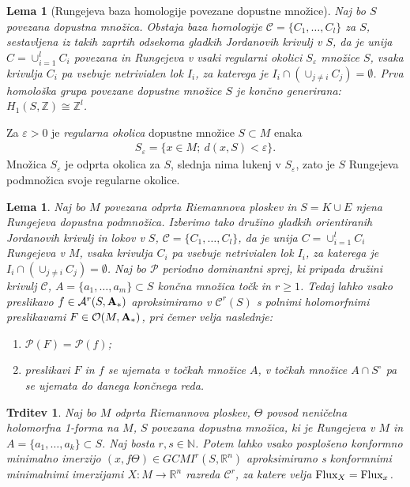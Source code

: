 \documentclass[12pt,a4paper,twoside]{article}
\theoremstyle{definition} %
\theoremstyle{plain} %
\newtheorem{lema}[definicija]{Lema}
\newtheorem{trditev}[definicija]{Trditev}
\numberwithin{equation}{section}  %
\newcommand{\R}{\mathbb R}
\newcommand{\N}{\mathbb N}
\begin{document}
\begin{lema} [Rungejeva baza homologije povezane dopustne množice]
Naj bo $S$ povezana dopustna množica. Obstaja baza homologije $\mathcal{C} = \{ C_{1}, \dots , C_{l} \}$ za $S$, sestavljena iz takih zaprtih odsekoma gladkih Jordanovih krivulj v $S$, da je unija $C = \cup_{i=1}^{l} C_{i}$ povezana in Rungejeva v vsaki regularni okolici $S_{\varepsilon}$ množice $S$, vsaka krivulja $C_{i}$ pa vsebuje netrivialen lok $I_{i}$, za katerega je $I_{i} \cap (\cup_{j \neq i} C_{j}) = \emptyset$.
Prva homološka grupa povezane dopustne množice $S$ je končno generirana: $H_{1}(S, \mathbb{Z}) \cong \mathbb{Z}^{l}$.
\end{lema}

Za $\varepsilon > 0$ je \emph{regularna okolica} dopustne množice $S \subset M$ enaka
\begin{gather}
S_{\varepsilon} = \{ x \in M; \ d(x,S) < \varepsilon \}.
\end{gather}
Množica $S_{\varepsilon}$ je odprta okolica za $S$, slednja nima lukenj v $S_{\varepsilon}$, zato je $S$ Rungejeva podmnožica svoje regularne okolice.

\begin{lema}
Naj bo $M$ povezana odprta Riemannova ploskev in $S = K \cup E$ njena Rungejeva dopustna podmnožica.
Izberimo tako družino gladkih orientiranih Jordanovih krivulj in lokov v $S$, $\mathcal{C} = \{ C_{1}, \dots , C_{l} \}$, da je unija $C = \cup_{i=1}^{l} C_{i}$ Rungejeva v $M$, vsaka krivulja $C_{i}$ pa vsebuje netrivialen lok $I_{i}$, za katerega je $I_{i} \cap (\cup_{j \neq i} C_{j}) = \emptyset$.
Naj bo $\mathcal{P}$ periodno dominantni sprej, ki pripada družini krivulj $\mathcal{C}$, $A = \{ a_{1}, \dots , a_{m} \} \subset S$ končna množica točk in $r \geq 1$.
Tedaj lahko vsako preslikavo $f \in \mathcal{A}^{r}(S, \textbf{\textup{A}}_{*})$ aproksimiramo v $\mathcal{C}^{r}(S)$ s polnimi holomorfnimi preslikavami $F \in \mathcal{O}(M,\textbf{\textup{A}}_{*})$, pri čemer velja naslednje:
\begin{enumerate}
\item $\mathcal{P}(F) = \mathcal{P}(f)$;
\item preslikavi $F$ in $f$ se ujemata v točkah množice $A$, v točkah množice $A \cap S^{\circ}$ pa se ujemata do danega končnega reda.
\end{enumerate}
\end{lema}

\begin{trditev}
Naj bo $M$ odprta Riemannova ploskev, $\Theta$ povsod neničelna holomorfna 1-forma na $M$, $S$ povezana dopustna množica, ki je Rungejeva v $M$ in $A=\{a_{1}, \dots , a_{k} \} \subset S$. Naj bosta $r, s \in \N$. 
Potem lahko vsako posplošeno konformno minimalno imerzijo $(x, f\Theta) \in GCMI^{r}(S,\R^{n})$ aproksimiramo s konformnimi minimalnimi imerzijami $X \colon M \to \R^{n}$ razreda $\mathcal{C}^{r}$, za katere velja $\textup{Flux}_{X} = \textup{Flux}_{x}$. 
\end{trditev}
\end{document}
